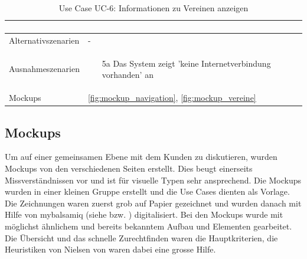 \begin{table}[ht]
\begin{tabular}{ l | p{10cm} }
\begin{enumerate}
					\end{enumerate}
					\\ \hline
	Alternativszenarien	&	-\\ \hline
	Ausnahmeszenarien&	\begin{enumerate}
					\item[5a] Das System zeigt 'keine Internetverbindung vorhanden' an
					\end{enumerate}
					\\ \hline
	Mockups	 	&	\ref{fig:mockup_navigation}, \ref{fig:mockup_vereine}
  \end{tabular}
   \caption{Use Case UC-6: Informationen zu Vereinen anzeigen}\label{table:use_case_6}
\end{table}

\FloatBarrier
\subsection{Mockups}\label{mockups}
Um auf einer gemeinsamen Ebene mit dem Kunden zu diskutieren, wurden Mockups von den verschiedenen Seiten erstellt. Dies beugt einerseits Missverständnissen vor und ist für visuelle Typen sehr ansprechend. Die Mockups wurden in einer kleinen Gruppe erstellt und die Use Cases dienten als Vorlage. Die Zeichnungen waren zuerst grob auf Papier gezeichnet und wurden danach mit Hilfe von mybalsamiq (siehe \cite{zhaw_mybalsamiq} bzw. \cite{mybalsamiq}) digitalisiert. Bei den Mockups wurde mit möglichst ähnlichem und bereits bekanntem Aufbau und Elementen gearbeitet. Die Übersicht und das schnelle Zurechtfinden waren die Hauptkriterien, die Heuristiken von Nielsen von \cite{paper_usability} waren dabei eine grosse Hilfe.

